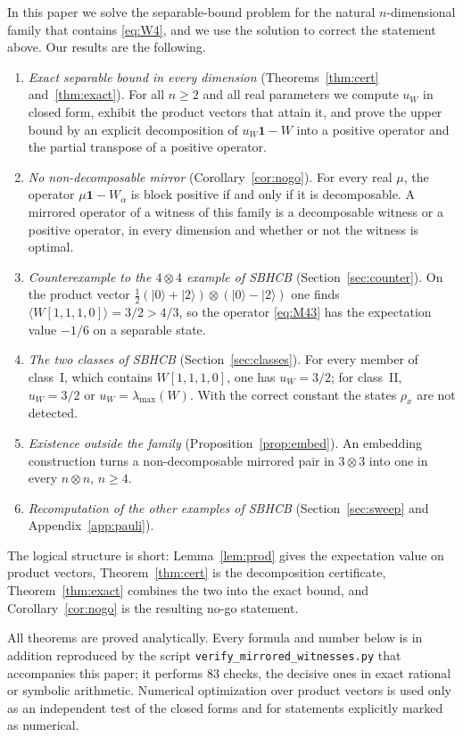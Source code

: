 \documentclass[11pt,a4paper]{article}
\theoremstyle{remark}
\newcommand{\ket}[1]{\lvert #1\rangle}
\newcommand{\id}{\mathbf{1}}
\newcommand{\uW}{u_W}
\newcommand{\lmax}{\lambda_{\max}}
\begin{document}
In this paper we solve the separable-bound problem for the natural $n$-dimensional family
that contains \eqref{eq:W4}, and we use the solution to correct the statement above. Our
results are the following.
\begin{enumerate}
\item \emph{Exact separable bound in every dimension}
(Theorems~\ref{thm:cert} and~\ref{thm:exact}). For all $n\ge2$ and all real parameters
we compute $\uW$ in closed form, exhibit the product vectors that attain it, and prove
the upper bound by an explicit decomposition of $\uW\id-W$ into a positive operator and
the partial transpose of a positive operator.
\item \emph{No non-decomposable mirror} (Corollary~\ref{cor:nogo}). For every real $\mu$,
the operator $\mu\id-W_\alpha$ is block positive if and only if it is decomposable. A
mirrored operator of a witness of this family is a decomposable witness or a positive
operator, in every dimension and whether or not the witness is optimal.
\item \emph{Counterexample to the $4\otimes4$ example of SBHCB}
(Section~\ref{sec:counter}). On the product vector
$\tfrac12(\ket0+\ket2)\otimes(\ket0-\ket2)$ one finds
$\langle W[1,1,1,0]\rangle=3/2>4/3$, so the operator \eqref{eq:M43} has the expectation
value $-1/6$ on a separable state.
\item \emph{The two classes of SBHCB} (Section~\ref{sec:classes}). For every member of
class~I, which contains $W[1,1,1,0]$, one has $\uW=3/2$; for class~II, $\uW=3/2$ or
$\uW=\lmax(W)$. With the correct constant the states $\rho_x$ are not detected.
\item \emph{Existence outside the family} (Proposition~\ref{prop:embed}). An embedding
construction turns a non-decomposable mirrored pair in $3\otimes3$ into one in every
$n\otimes n$, $n\ge4$.
\item \emph{Recomputation of the other examples of SBHCB} (Section~\ref{sec:sweep} and
Appendix~\ref{app:pauli}).
\end{enumerate}
The logical structure is short: Lemma~\ref{lem:prod} gives the expectation value on
product vectors, Theorem~\ref{thm:cert} is the decomposition certificate,
Theorem~\ref{thm:exact} combines the two into the exact bound, and
Corollary~\ref{cor:nogo} is the resulting no-go statement.

All theorems are proved analytically. Every formula and number below is in addition
reproduced by the script \texttt{verify\_mirrored\_witnesses.py} that accompanies this
paper; it performs 83 checks, the decisive ones in exact rational or symbolic arithmetic.
Numerical optimization over product vectors is used only as an independent test of the
closed forms and for statements explicitly marked as numerical.
\end{document}
